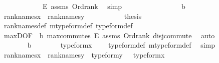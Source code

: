 \begin{isabellebody}
\ \ \ \ \ \ \ \ \ \ \ \ E\ assms\ Ord{\isacharunderscore}{\kern0pt}rank\ \isamarkupfalse%
\ simp\isanewline
\ \ \ \ \ \ \isamarkupfalse%
\isanewline
\ \ \ \ \ \ \ \ \isamarkupfalse%
\ b\isanewline
\ \ \ \ \ \ \ \ \isamarkupfalse%
\ {\isacartoucheopen}rank{\isacharunderscore}{\kern0pt}names{\isacharparenleft}{\kern0pt}x{\isacharparenright}{\kern0pt}\ {\isacharequal}{\kern0pt}\ rank{\isacharunderscore}{\kern0pt}names{\isacharparenleft}{\kern0pt}y{\isacharparenright}{\kern0pt}\ {\isacartoucheclose}\isanewline
\ \ \ \ \ \ \ \ \isamarkupfalse%
\ {\isacharquery}{\kern0pt}thesis\ \isamarkupfalse%
\ rank{\isacharunderscore}{\kern0pt}names{\isacharunderscore}{\kern0pt}def\ mtype{\isacharunderscore}{\kern0pt}form{\isacharunderscore}{\kern0pt}def\ type{\isacharunderscore}{\kern0pt}form{\isacharunderscore}{\kern0pt}def\ \isanewline
\ \ \ \ \ \ \ \ \ \ \isamarkupfalse%
\ max{\isacharunderscore}{\kern0pt}D{}{\isacharbrackleft}{\kern0pt}OF\ {\isacharunderscore}{\kern0pt}\ b{\isacharbrackright}{\kern0pt}\ max{\isacharunderscore}{\kern0pt}commutes\ E\ assms\ Ord{\isacharunderscore}{\kern0pt}rank\ disj{\isacharunderscore}{\kern0pt}commute\ \isamarkupfalse%
\ auto\isanewline
\ \ \ \ \ \ \isamarkupfalse%
\isanewline
\ \ \ \ \ \ \isamarkupfalse%
\ b\isanewline
\ \ \ \ \ \ \isamarkupfalse%
\ {\isachardoublequoteopen}type{\isacharunderscore}{\kern0pt}form{\isacharparenleft}{\kern0pt}x{\isacharparenright}{\kern0pt}\ {\isacharequal}{\kern0pt}\ {}{\isachardoublequoteclose}\ \isamarkupfalse%
\ type{\isacharunderscore}{\kern0pt}form{\isacharunderscore}{\kern0pt}def\ mtype{\isacharunderscore}{\kern0pt}form{\isacharunderscore}{\kern0pt}def\ \isamarkupfalse%
\ simp\isanewline
\ \ \ \ \ \ \isamarkupfalse%
\ {\isacartoucheopen}rank{\isacharunderscore}{\kern0pt}names{\isacharparenleft}{\kern0pt}x{\isacharparenright}{\kern0pt}\ {\isacharequal}{\kern0pt}\ rank{\isacharunderscore}{\kern0pt}names{\isacharparenleft}{\kern0pt}y{\isacharparenright}{\kern0pt}\ {\isacartoucheclose}\ {\isacartoucheopen}type{\isacharunderscore}{\kern0pt}form{\isacharparenleft}{\kern0pt}y{\isacharparenright}{\kern0pt}\ {\isacharequal}{\kern0pt}\ {}{\isacartoucheclose}\ {\isacartoucheopen}type{\isacharunderscore}{\kern0pt}form{\isacharparenleft}{\kern0pt}x{\isacharparenright}{\kern0pt}\ {\isacharequal}{\kern0pt}\ {}{\isacartoucheclose}\isanewline

\end{isabellebody}
